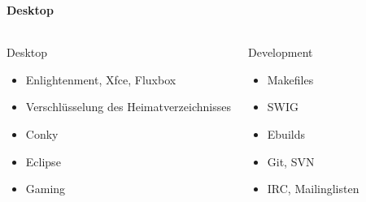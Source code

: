 \documentclass[utf8]{beamer}
\begin{document}
\begin{frame}
  \frametitle{\insertsectionhead}
  \framesubtitle{Desktop}

\begin{columns}
\begin{block}{Desktop}
  \begin{itemize}
    \item Enlightenment, Xfce, Fluxbox
    \item Verschlüsselung des Heimatverzeichnisses
    \item Conky
    \item Eclipse
    \item Gaming
  \end{itemize}
\end{block}

\begin{block}{Development}
  \begin{itemize}
    \item Makefiles
    \item SWIG
    \item Ebuilds
    \item Git, SVN
    \item IRC, Mailinglisten
    \vspace{2\baselineskip}
  \end{itemize}
\end{block}
\end{columns}
\end{frame}
\end{document}
